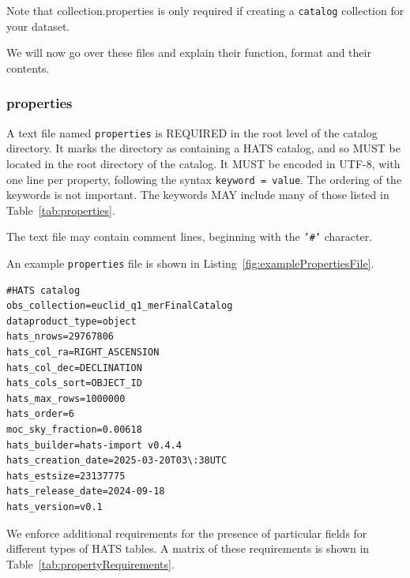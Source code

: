 \documentclass[11pt,a4paper]{ivoa}
\begin{document}
Note that collection.properties is only required if creating a \texttt{catalog} collection for your dataset. \par 
We will now go over these files and explain their function, format and their contents. 
    
\subsubsection{properties} 

A text file named \texttt{properties} is REQUIRED in the root level of the catalog directory.
It marks the directory as containing a HATS catalog, and so MUST be located in the root directory of the catalog.
It MUST be encoded in UTF-8, with one line per property, following the syntax \texttt{keyword = value}.
The ordering of the keywords is not important. The keywords MAY include many of those listed in Table~\ref{tab:properties}.

The text file may contain comment lines, beginning with the \texttt{'\#'} character.

An example \texttt{properties} file is shown in Listing~\ref{fig:examplePropertiesFile}.

\begin{minipage}{\linewidth}
\begin{lstlisting}[caption=Example \texttt{properties} file contents, label=fig:examplePropertiesFile]
#HATS catalog
obs_collection=euclid_q1_merFinalCatalog
dataproduct_type=object
hats_nrows=29767806
hats_col_ra=RIGHT_ASCENSION
hats_col_dec=DECLINATION
hats_cols_sort=OBJECT_ID
hats_max_rows=1000000
hats_order=6
moc_sky_fraction=0.00618
hats_builder=hats-import v0.4.4
hats_creation_date=2025-03-20T03\:38UTC
hats_estsize=23137775
hats_release_date=2024-09-18
hats_version=v0.1
\end{lstlisting}
\end{minipage}

We enforce additional requirements for the presence of particular fields for different types of HATS tables. 
A matrix of these requirements is shown in Table~\ref{tab:propertyRequirements}.
\end{document}

